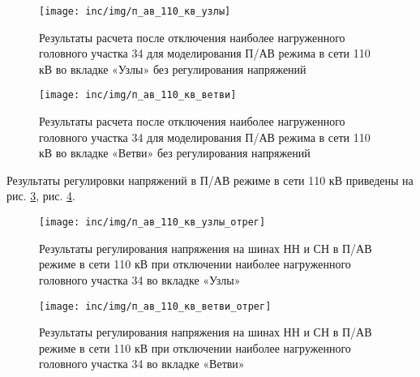 \begin{figure}[H]
	\centering
	\texttt{[image: inc/img/п\_ав\_110\_кв\_узлы]}
	\caption{Результаты расчета после отключения наиболее нагруженного головного участка 34 для моделирования П/АВ режима в сети 110 кВ во вкладке «Узлы» без регулирования напряжений}
	\label{fig:п/ав_в_сети_110_кв_узлы}
\end{figure}

\begin{figure}[H]
	\centering
	\texttt{[image: inc/img/п\_ав\_110\_кв\_ветви]}
	\caption{Результаты расчета после отключения наиболее нагруженного головного участка 34 для моделирования П/АВ режима в сети 110 кВ во вкладке «Ветви» без регулирования напряжений}
	\label{fig:п/ав_в_сети_110_кв_ветви}
\end{figure}

Результаты регулировки напряжений в П/АВ режиме в сети 110 кВ приведены на рис. \ref{fig:п/ав_в_сети_110_кв_узлы_отрег}, рис. \ref{fig:п/ав_в_сети_110_кв_ветви_отрег}.

\begin{figure}[H]
	\centering
	\texttt{[image: inc/img/п\_ав\_110\_кв\_узлы\_отрег]}
	\caption{Результаты регулирования напряжения на шинах НН и СН в П/АВ режиме в сети 110 кВ при отключении наиболее нагруженного головного участка 34 во вкладке «Узлы»}
	\label{fig:п/ав_в_сети_110_кв_узлы_отрег}
\end{figure}

\begin{figure}[H]
	\centering
	\texttt{[image: inc/img/п\_ав\_110\_кв\_ветви\_отрег]}
	\caption{Результаты регулирования напряжения на шинах НН и СН в П/АВ режиме в сети 110 кВ при отключении наиболее нагруженного головного участка 34 во вкладке «Ветви»}
	\label{fig:п/ав_в_сети_110_кв_ветви_отрег}
\end{figure}